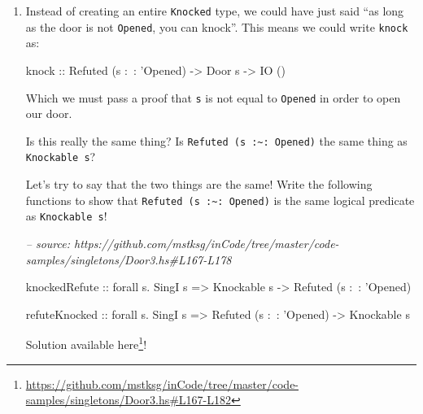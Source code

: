 \documentclass[]{article}
\newenvironment{Shaded}{}{}
\newcommand{\CommentTok}[1]{\textcolor[rgb]{0.38,0.63,0.69}{\textit{#1}}}
\newcommand{\DataTypeTok}[1]{\textcolor[rgb]{0.56,0.13,0.00}{#1}}
\newcommand{\FunctionTok}[1]{\textcolor[rgb]{0.02,0.16,0.49}{#1}}
\newcommand{\NormalTok}[1]{#1}
\newcommand{\OtherTok}[1]{\textcolor[rgb]{0.00,0.44,0.13}{#1}}
\renewcommand{\href}[2]{#2\footnote{\url{#1}}}
\begin{document}
\begin{enumerate}
  Solutions available
  \href{https://github.com/mstksg/inCode/tree/master/code-samples/singletons/Door3.hs\#L120-L164}{here}!
\item
  Instead of creating an entire \texttt{Knocked} type, we could have just said
  ``as long as the door is not \texttt{\textquotesingle{}Opened}, you can
  knock''. This means we could write \texttt{knock} as:

\begin{Shaded}
\begin{Highlighting}[]
\OtherTok{knock ::} \DataTypeTok{Refuted}\NormalTok{ (s }\FunctionTok{:~:}\NormalTok{ '}\DataTypeTok{Opened}\NormalTok{) }\OtherTok{->} \DataTypeTok{Door}\NormalTok{ s }\OtherTok{->} \DataTypeTok{IO}\NormalTok{ ()}
\end{Highlighting}
\end{Shaded}

  Which we must pass a proof that \texttt{s} is not equal to
  \texttt{\textquotesingle{}Opened} in order to open our door.

  Is this really the same thing? Is
  \texttt{Refuted\ (s\ :\textasciitilde{}:\ \textquotesingle{}Opened)} the same
  thing as \texttt{Knockable\ s}?

  Let's try to say that the two things are the same! Write the following
  functions to show that
  \texttt{Refuted\ (s\ :\textasciitilde{}:\ \textquotesingle{}Opened)} is the
  same logical predicate as \texttt{Knockable\ s}!

\begin{Shaded}
\begin{Highlighting}[]
\CommentTok{-- source: https://github.com/mstksg/inCode/tree/master/code-samples/singletons/Door3.hs#L167-L178}

\NormalTok{knockedRefute}
\OtherTok{    ::}\NormalTok{ forall s}\FunctionTok{.} \DataTypeTok{SingI}\NormalTok{ s}
    \OtherTok{=>} \DataTypeTok{Knockable}\NormalTok{ s}
    \OtherTok{->} \DataTypeTok{Refuted}\NormalTok{ (s }\FunctionTok{:~:}\NormalTok{ '}\DataTypeTok{Opened}\NormalTok{)}

\NormalTok{refuteKnocked}
\OtherTok{    ::}\NormalTok{ forall s}\FunctionTok{.} \DataTypeTok{SingI}\NormalTok{ s}
    \OtherTok{=>} \DataTypeTok{Refuted}\NormalTok{ (s }\FunctionTok{:~:}\NormalTok{ '}\DataTypeTok{Opened}\NormalTok{)}
    \OtherTok{->} \DataTypeTok{Knockable}\NormalTok{ s}
\end{Highlighting}
\end{Shaded}

  Solution available
  \href{https://github.com/mstksg/inCode/tree/master/code-samples/singletons/Door3.hs\#L167-L182}{here}!


\end{enumerate}
\end{document}
